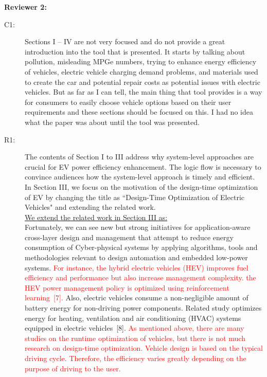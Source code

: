 \documentclass[onecolumn]{IEEEconf}
\begin{document}
\textbf{Reviewer 2:}
\begin{description}
\item [C1: ] Sections I -- IV are not very focused and do not provide a great introduction into the tool that is presented. It starts by talking about pollution, misleading MPGe numbers, trying to enhance energy efficiency of vehicles, electric vehicle charging demand problems, and materials used to create the car and potential repair costs as potential issues with electric vehicles. But as far as I can tell, the main thing that tool provides is a way for consumers to easily choose vehicle options based on their user requirements and these sections should be focused on this. I had no idea what the paper was about until the tool was presented.
\item [R1: ] The contents of Section I to III address why system-level approaches are crucial for EV power efficiency enhancement. The logic flow is necessary to convince audiences how the system-level approach is timely and efficient.\\ 
In Section III, we focus on the motivation of the design-time optimization of EV by changing the title as ``Design-Time Optimization of Electric Vehicles" and extending the related work.\\

\underline{We extend the related work in Section III as:}\\
Fortunately, we can see new but strong initiatives for application-aware cross-layer design and management that attempt to reduce energy consumption of Cyber-physical systems by applying algorithms, tools and methodologies relevant to design automation and embedded low-power systems. \textcolor{red}{For instance, the hybrid electric vehicles (HEV) improves fuel efficiency and performance but also increase management complexity. the HEV power management policy is optimized using reinforcement learning~[7].} Also, electric vehicles consume a non-negligible amount of battery energy for non-driving power components. Related study optimizes energy for heating, ventilation and air conditioning (HVAC) systems equipped in electric vehicles~[8].
\textcolor{red}{As mentioned above, there are many studies on the runtime optimization of vehicles, but there is not much research on design-time optimization. Vehicle design is based on the typical driving cycle. Therefore, the efficiency varies greatly depending on the purpose of driving to the user.}
~\\


\end{description}
\end{document}
